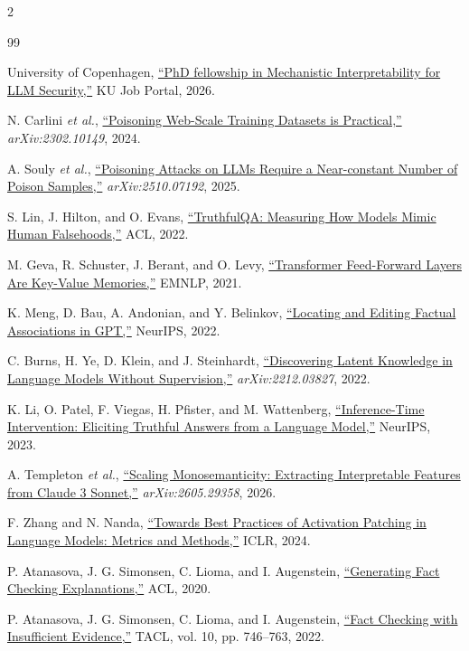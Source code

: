 \documentclass[10pt,a4paper]{article}
\begin{document}
\begin{multicols}{2}
\begin{thebibliography}{99}
\setlength{\itemsep}{0.05em}
\setlength{\parsep}{0pt}
\raggedright
{}
University of Copenhagen, \href{https://jobportal.ku.dk/phd/?show=160571}{``PhD fellowship in Mechanistic Interpretability for LLM Security,''} KU Job Portal, 2026.

N. Carlini \textit{et al.}, \href{https://arxiv.org/abs/2302.10149}{``Poisoning Web-Scale Training Datasets is Practical,''} \textit{arXiv:2302.10149}, 2024.

A. Souly \textit{et al.}, \href{https://arxiv.org/abs/2510.07192}{``Poisoning Attacks on LLMs Require a Near-constant Number of Poison Samples,''} \textit{arXiv:2510.07192}, 2025.

S. Lin, J. Hilton, and O. Evans, \href{https://aclanthology.org/2022.acl-long.229/}{``TruthfulQA: Measuring How Models Mimic Human Falsehoods,''} ACL, 2022.

M. Geva, R. Schuster, J. Berant, and O. Levy, \href{https://aclanthology.org/2021.emnlp-main.446/}{``Transformer Feed-Forward Layers Are Key-Value Memories,''} EMNLP, 2021.

K. Meng, D. Bau, A. Andonian, and Y. Belinkov, \href{https://arxiv.org/abs/2202.05262}{``Locating and Editing Factual Associations in GPT,''} NeurIPS, 2022.

C. Burns, H. Ye, D. Klein, and J. Steinhardt, \href{https://arxiv.org/abs/2212.03827}{``Discovering Latent Knowledge in Language Models Without Supervision,''} \textit{arXiv:2212.03827}, 2022.

K. Li, O. Patel, F. Viegas, H. Pfister, and M. Wattenberg, \href{https://proceedings.neurips.cc/paper_files/paper/2023/hash/81b8390039b7302c909cb769f8b6cd93-Abstract-Conference.html}{``Inference-Time Intervention: Eliciting Truthful Answers from a Language Model,''} NeurIPS, 2023.

A. Templeton \textit{et al.}, \href{https://arxiv.org/abs/2605.29358}{``Scaling Monosemanticity: Extracting Interpretable Features from Claude 3 Sonnet,''} \textit{arXiv:2605.29358}, 2026.

F. Zhang and N. Nanda, \href{https://openreview.net/forum?id=Hf17y6u9BC}{``Towards Best Practices of Activation Patching in Language Models: Metrics and Methods,''} ICLR, 2024.

P. Atanasova, J. G. Simonsen, C. Lioma, and I. Augenstein, \href{https://aclanthology.org/2020.acl-main.656/}{``Generating Fact Checking Explanations,''} ACL, 2020.

P. Atanasova, J. G. Simonsen, C. Lioma, and I. Augenstein, \href{https://aclanthology.org/2022.tacl-1.43/}{``Fact Checking with Insufficient Evidence,''} TACL, vol. 10, pp. 746--763, 2022.
\end{thebibliography}
\end{multicols}
\endgroup
\end{document}
